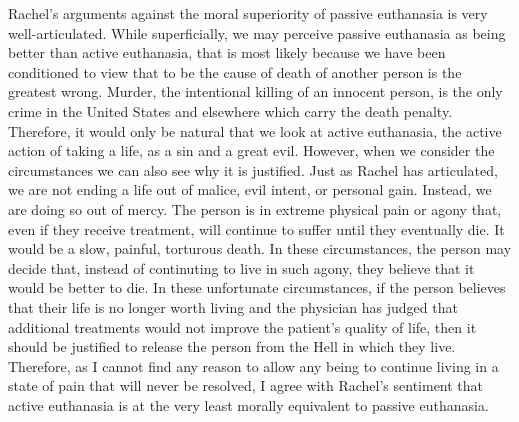 \documentclass{article}
\begin{document}
Rachel's arguments against the moral superiority of passive euthanasia is very well-articulated. While
superficially, we may perceive passive euthanasia as being better than active euthanasia, that is most
likely because we have been conditioned to view that to be the cause of death of another person is the
greatest wrong. Murder, the intentional killing of an innocent person, is the only crime in the United
States and elsewhere which carry the death penalty. Therefore, it would only be natural that we look
at active euthanasia, the active action of taking a life, as a sin and a great evil. However, when we
consider the circumstances we can also see why it is justified. Just as Rachel has articulated, we are not
ending a life out of malice, evil intent, or personal gain. Instead, we are doing so out of mercy.
The person is in extreme physical pain or agony that, even if they receive treatment, will continue to suffer
until they eventually die. It would be a slow, painful, torturous death. In these circumstances, the person
may decide that, instead of continuting to live in such agony, they believe that it would be better to die.
In these unfortunate circumstances, if the person believes that their life is no longer worth living
and the physician has judged that additional treatments would not improve the patient's quality of life, then
it should be justified to release the person from the Hell in which they live. Therefore, as I cannot find
any reason to allow any being to continue living in a state of pain that will never be resolved, I agree
with Rachel's sentiment that active euthanasia is at the very least morally equivalent to passive euthanasia.
\end{document}

